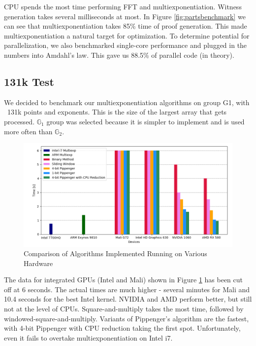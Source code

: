 CPU spends the most time performing FFT and multiexponentiation. Witness generation takes several milliseconds at most. In Figure \ref{fig:partsbenchmark} we can see that multiexponentiation takes 85\% time of proof generation. This made multiexponentiation a natural target for optimization. To determine potential for parallelization, we also benchmarked single-core performance and plugged in the numbers into Amdahl's law. This gave us 88.5\% of parallel code (in theory).\\

\subsection{131k Test}

We decided to benchmark our multiexponentiation algorithms on group G1, with ~131k points and exponents. This is the size of the largest array that gets processed. $\mathbb{G}_1$ group was selected because it is simpler to implement and is used more often than $\mathbb{G}_2$.
\begin{figure}[h]
    \includegraphics[width=\linewidth]{Figures/finalresults.png}
    \caption{Comparison of Algorithms Implemented Running on Various Hardware}
    \label{fig:finalresults}
\end{figure}
The data for integrated GPUs (Intel and Mali) shown in Figure \ref{fig:finalresults} has been cut off at 6 seconds. The actual times are much higher - several minutes for Mali and 10.4 seconds for the best Intel kernel. NVIDIA and AMD perform better, but still not at the level of CPUs. Square-and-multiply takes the most time, followed by windowed-square-and-multiply. Variants of Pippenger's algorithm are the fastest, with 4-bit Pippenger with CPU reduction taking the first spot. Unfortunately, even it fails to overtake multiexponentiation on Intel i7.
